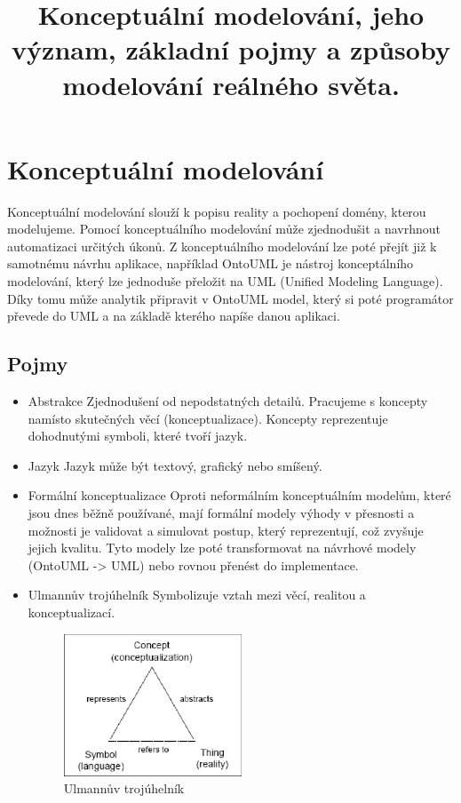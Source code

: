 \documentclass{szzclass}
\title{Konceptuální modelování, jeho význam, základní pojmy a způsoby modelování reálného světa.}
\begin{document}
\maketitle

\tableofcontents
\newpage

\section{Konceptuální modelování}

Konceptuální modelování slouží k popisu reality a pochopení domény, kterou modelujeme.
Pomocí konceptuálního modelování může zjednodušit a navrhnout automatizaci určitých úkonů.
Z konceptuálního modelování lze poté přejít již k samotnému návrhu aplikace, například OntoUML je nástroj konceptálního modelování,
který lze jednoduše přeložit na UML (Unified Modeling Language). Díky tomu může analytik připravit v OntoUML model, který si
poté programátor převede do UML a na základě kterého napíše danou aplikaci.

\subsection{Pojmy}

\begin{itemize}
    \item Abstrakce
          Zjednodušení od nepodstatných detailů. Pracujeme s koncepty namísto skutečných věcí (konceptualizace).
          Koncepty reprezentuje dohodnutými symboli, které tvoří jazyk.
    \item Jazyk
          Jazyk může být textový, grafický nebo smíšený.
    \item Formální konceptualizace
          Oproti neformálním konceptuálním modelům, které jsou dnes běžně používané, mají formální modely
          výhody v přesnosti a možnosti je validovat a simulovat postup, který reprezentují, což zvyšuje jejich kvalitu.
          Tyto modely lze poté transformovat na návrhové modely (OntoUML -> UML) nebo rovnou přenést do implementace.
    \item Ulmannův trojúhelník
          Symbolizuje vztah mezi věcí, realitou a konceptualizací.
          \begin{figure}[ht]
            \centering
            \includegraphics[width=0.5\textwidth]{topics/bi-wsi-si-5/ulmanns_triangle.png}
            \caption{Ulmannův trojúhelník}
          \end{figure}
\end{itemize}
\end{document}
